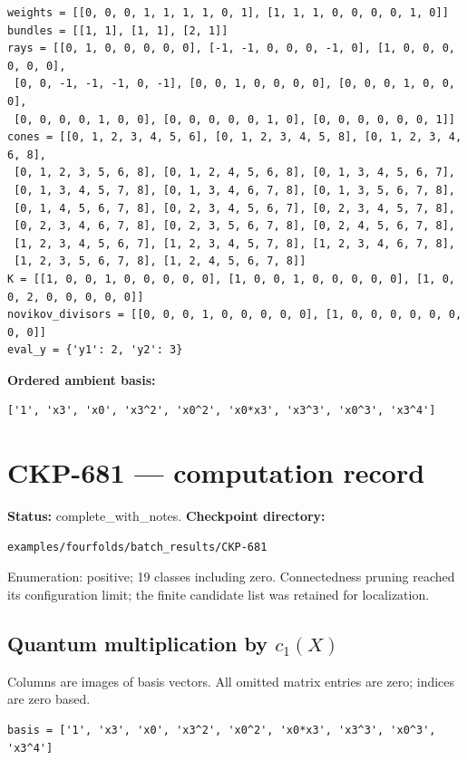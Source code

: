 \documentclass[10pt,a4paper]{article}
\begin{document}
\begin{lstlisting}
weights = [[0, 0, 0, 1, 1, 1, 1, 0, 1], [1, 1, 1, 0, 0, 0, 0, 1, 0]]
bundles = [[1, 1], [1, 1], [2, 1]]
rays = [[0, 1, 0, 0, 0, 0, 0], [-1, -1, 0, 0, 0, -1, 0], [1, 0, 0, 0, 0, 0, 0],
 [0, 0, -1, -1, -1, 0, -1], [0, 0, 1, 0, 0, 0, 0], [0, 0, 0, 1, 0, 0, 0],
 [0, 0, 0, 0, 1, 0, 0], [0, 0, 0, 0, 0, 1, 0], [0, 0, 0, 0, 0, 0, 1]]
cones = [[0, 1, 2, 3, 4, 5, 6], [0, 1, 2, 3, 4, 5, 8], [0, 1, 2, 3, 4, 6, 8],
 [0, 1, 2, 3, 5, 6, 8], [0, 1, 2, 4, 5, 6, 8], [0, 1, 3, 4, 5, 6, 7],
 [0, 1, 3, 4, 5, 7, 8], [0, 1, 3, 4, 6, 7, 8], [0, 1, 3, 5, 6, 7, 8],
 [0, 1, 4, 5, 6, 7, 8], [0, 2, 3, 4, 5, 6, 7], [0, 2, 3, 4, 5, 7, 8],
 [0, 2, 3, 4, 6, 7, 8], [0, 2, 3, 5, 6, 7, 8], [0, 2, 4, 5, 6, 7, 8],
 [1, 2, 3, 4, 5, 6, 7], [1, 2, 3, 4, 5, 7, 8], [1, 2, 3, 4, 6, 7, 8],
 [1, 2, 3, 5, 6, 7, 8], [1, 2, 4, 5, 6, 7, 8]]
K = [[1, 0, 0, 1, 0, 0, 0, 0, 0], [1, 0, 0, 1, 0, 0, 0, 0, 0], [1, 0, 0, 2, 0, 0, 0, 0, 0]]
novikov_divisors = [[0, 0, 0, 1, 0, 0, 0, 0, 0], [1, 0, 0, 0, 0, 0, 0, 0, 0]]
eval_y = {'y1': 2, 'y2': 3}
\end{lstlisting}

\textbf{Ordered ambient basis:}
\begin{lstlisting}
['1', 'x3', 'x0', 'x3^2', 'x0^2', 'x0*x3', 'x3^3', 'x0^3', 'x3^4']
\end{lstlisting}

\clearpage\section*{CKP-681 --- computation record}
\textbf{Status:} complete\_with\_notes.
\textbf{Checkpoint directory:}
\begin{lstlisting}
examples/fourfolds/batch_results/CKP-681
\end{lstlisting}

Enumeration: positive; 19 classes including zero.
Connectedness pruning reached its configuration limit; the finite candidate list was retained for localization.
\subsection*{Quantum multiplication by $c_1(X)$}
Columns are images of basis vectors. All omitted matrix entries are zero; indices are zero based.

\begin{lstlisting}
basis = ['1', 'x3', 'x0', 'x3^2', 'x0^2', 'x0*x3', 'x3^3', 'x0^3', 'x3^4']
\end{lstlisting}
\end{document}

